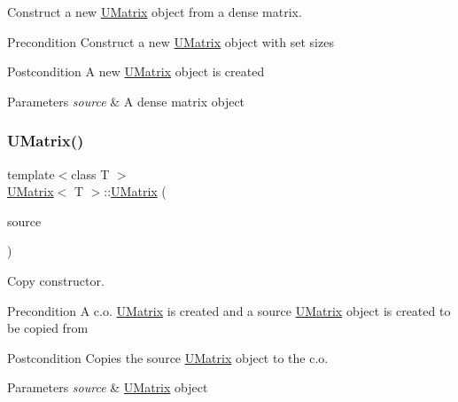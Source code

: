 Construct a new \mbox{\hyperlink{class_u_matrix}{U\+Matrix}} object from a dense matrix. 

\begin{DoxyPrecond}{Precondition}
Construct a new \mbox{\hyperlink{class_u_matrix}{U\+Matrix}} object with set sizes 
\end{DoxyPrecond}
\begin{DoxyPostcond}{Postcondition}
A new \mbox{\hyperlink{class_u_matrix}{U\+Matrix}} object is created 
\end{DoxyPostcond}

\begin{DoxyParams}{Parameters}
{\em source} & A dense matrix object \\
\hline
\end{DoxyParams}
\mbox{\label{class_u_matrix_ab95abe504ff32df243d625b6b749077d}} 
\subsubsection{\texorpdfstring{UMatrix()}{UMatrix()}\hspace{0.1cm}{\footnotesize\ttfamily [4/4]}}
{\footnotesize\ttfamily template$<$class T $>$ \\
\mbox{\hyperlink{class_u_matrix}{U\+Matrix}}$<$ T $>$\+::\mbox{\hyperlink{class_u_matrix}{U\+Matrix}} (\begin{DoxyParamCaption}\item[{const \mbox{\hyperlink{class_u_matrix}{U\+Matrix}}$<$ T $>$ \&}]{source }\end{DoxyParamCaption})}



Copy constructor. 

\begin{DoxyPrecond}{Precondition}
A c.\+o. \mbox{\hyperlink{class_u_matrix}{U\+Matrix}} is created and a source \mbox{\hyperlink{class_u_matrix}{U\+Matrix}} object is created to be copied from 
\end{DoxyPrecond}
\begin{DoxyPostcond}{Postcondition}
Copies the source \mbox{\hyperlink{class_u_matrix}{U\+Matrix}} object to the c.\+o. 
\end{DoxyPostcond}

\begin{DoxyParams}{Parameters}
{\em source} & \mbox{\hyperlink{class_u_matrix}{U\+Matrix}} object \\
\hline
\end{DoxyParams}
\mbox{\label{class_u_matrix_ada29056d4baec18fcb9bc47dc49e8d53}} 
